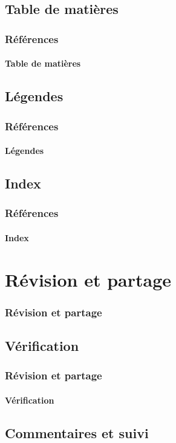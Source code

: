\documentclass[xcolor=table]{beamer}
\begin{document}
\subsection{Table de matières}

\begin{frame}
\frametitle{Références}
\framesubtitle{Table de matières}

\end{frame}

\subsection{Légendes}

\begin{frame}
\frametitle{Références}
\framesubtitle{Légendes}

\end{frame}

\subsection{Index}

\begin{frame}
\frametitle{Références}
\framesubtitle{Index}

\end{frame}

\section{Révision et partage}

\begin{frame}
\frametitle{Révision et partage}

\end{frame}

\subsection{Vérification}

\begin{frame}
\frametitle{Révision et partage}
\framesubtitle{Vérification}

\end{frame}

\subsection{Commentaires et suivi}
\end{document}

